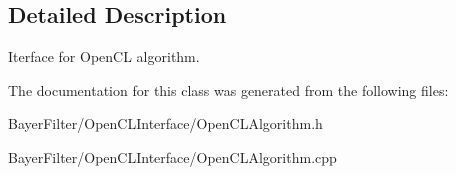 \subsection{Detailed Description}
Iterface for Open\-C\-L algorithm. 

The documentation for this class was generated from the following files\-:\begin{DoxyCompactItemize}
\item 
Bayer\-Filter/\-Open\-C\-L\-Interface/Open\-C\-L\-Algorithm.\-h\item 
Bayer\-Filter/\-Open\-C\-L\-Interface/Open\-C\-L\-Algorithm.\-cpp\end{DoxyCompactItemize}
